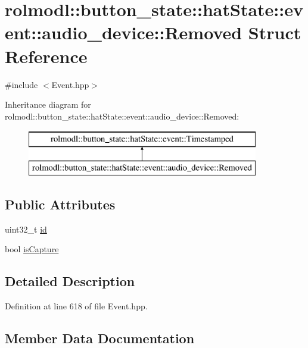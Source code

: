 \hypertarget{structrolmodl_1_1button__state_1_1hat_state_1_1event_1_1audio__device_1_1_removed}{}\section{rolmodl\+::button\+\_\+state\+::hat\+State\+::event\+::audio\+\_\+device\+::Removed Struct Reference}
\label{structrolmodl_1_1button__state_1_1hat_state_1_1event_1_1audio__device_1_1_removed}


{\ttfamily \#include $<$Event.\+hpp$>$}

Inheritance diagram for rolmodl\+::button\+\_\+state\+::hat\+State\+::event\+::audio\+\_\+device\+::Removed\+:\begin{figure}[H]
\begin{center}
\leavevmode
\includegraphics[height=2.000000cm]{structrolmodl_1_1button__state_1_1hat_state_1_1event_1_1audio__device_1_1_removed}
\end{center}
\end{figure}
\subsection*{Public Attributes}
\begin{DoxyCompactItemize}
\item 
uint32\+\_\+t \mbox{\hyperlink{structrolmodl_1_1button__state_1_1hat_state_1_1event_1_1audio__device_1_1_removed_a38d4b929e5da19c2902576630b623006}{id}}
\item 
bool \mbox{\hyperlink{structrolmodl_1_1button__state_1_1hat_state_1_1event_1_1audio__device_1_1_removed_a6cf59651c36436c5d2aeb9abea7c7116}{is\+Capture}}
\end{DoxyCompactItemize}


\subsection{Detailed Description}


Definition at line 618 of file Event.\+hpp.



\subsection{Member Data Documentation}
\mbox{\label{structrolmodl_1_1button__state_1_1hat_state_1_1event_1_1audio__device_1_1_removed_a38d4b929e5da19c2902576630b623006}} 
